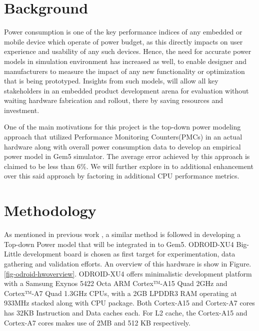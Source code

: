 \documentclass[conference]{IEEEtran}
\begin{document}
\section{Background}
    \par Power consumption is one of the key performance indices of any embedded or mobile device which operate of power budget, as this directly impacts on user experience and usability of any such devices. Hence, the need for accurate power models in simulation environment has increased as well, to enable designer and manufacturers to measure the impact of any new functionality or optimization that is being prototyped. Insights from such models, will allow all key stakeholders in an embedded product development arena for evaluation without waiting hardware fabrication and rollout, there by saving resources and investment.

    \par One of the main motivations for this project is the top-down power modeling approach\cite{Reddy2017EmpiricalCP} that utilized Performance Monitoring Counters(PMCs) in an actual hardware along with overall power consumption data to develop an empirical power model in Gem5 simulator\cite{10.1145/2024716.2024718}. The average error achieved by this approach is claimed to be less than 6\%. We will further explore in to additional enhancement over this said approach by factoring in additional CPU performance metrics.

\section{Methodology}
    \par As mentioned in previous work \cite{Reddy2017EmpiricalCP}, a similar method is followed in developing a Top-down Power model that will be integrated in to Gem5. ODROID-XU4\cite{odroid-xu4} Big-Little development board is chosen as first target for experimentation, data gathering and validation efforts. An overview of this hardware is show in Figure. \ref{fig-odroid-hwoverview}. ODROID-XU4 offers minimalistic development platform with a Samsung Exynos 5422 Octa ARM Cortex™-A15 Quad 2GHz and Cortex™-A7 Quad 1.3GHz CPUs, with a 2GB LPDDR3 RAM operating at 933MHz stacked along with CPU package. Both Cortex-A15 and Cortex-A7 cores has 32KB Instruction and Data caches each. For L2 cache, the Cortex-A15 and Cortex-A7 cores makes use of 2MB and 512 KB respectively.
\end{document}

